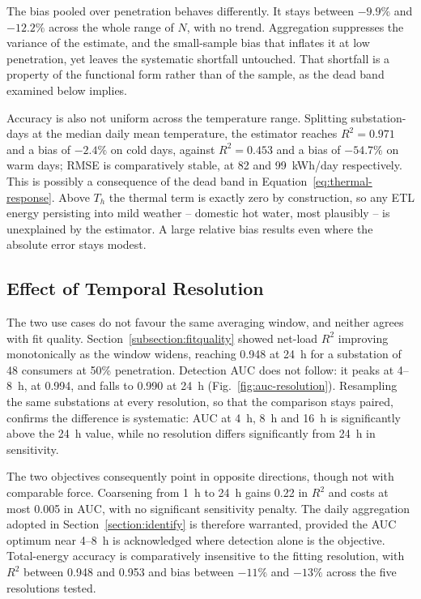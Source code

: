 \documentclass[9pt,journal,a4]{IEEEtran}
\begin{document}
The bias pooled over penetration behaves differently. It stays between $-9.9\%$ and $-12.2\%$ across the whole range of $N$, with no trend. Aggregation suppresses the variance of the estimate, and the small-sample bias that inflates it at low penetration, yet leaves the systematic shortfall untouched. That shortfall is a property of the functional form rather than of the sample, as the dead band examined below implies.

Accuracy is also not uniform across the temperature range. Splitting substation-days at the median daily mean temperature, the estimator reaches $R^2 = 0.971$ and a bias of $-2.4\%$ on cold days, against $R^2 = 0.453$ and a bias of $-54.7\%$ on warm days; RMSE is comparatively stable, at 82 and 99~kWh/day respectively. This is possibly a consequence of the dead band in Equation~\eqref{eq:thermal-response}. Above $T_h$ the thermal term is exactly zero by construction, so any ETL energy persisting into mild weather -- domestic hot water, most plausibly -- is unexplained by the estimator. A large relative bias results even where the absolute error stays modest.


\subsection{Effect of Temporal Resolution}
\label{subsection:resolution}

The two use cases do not favour the same averaging window, and neither agrees with fit quality. Section~\ref{subsection:fitquality} showed net-load $R^2$ improving monotonically as the window widens, reaching 0.948 at 24~h for a substation of 48 consumers at 50\% penetration. Detection AUC does not follow: it peaks at 4--8~h, at 0.994, and falls to 0.990 at 24~h (Fig.~\ref{fig:auc-resolution}). Resampling the same substations at every resolution, so that the comparison stays paired, confirms the difference is systematic: AUC at 4~h, 8~h and 16~h is significantly above the 24~h value, while no resolution differs significantly from 24~h in sensitivity.

The two objectives consequently point in opposite directions, though not with comparable force. Coarsening from 1~h to 24~h gains 0.22 in $R^2$ and costs at most 0.005 in AUC, with no significant sensitivity penalty. The daily aggregation adopted in Section~\ref{section:identify} is therefore warranted, provided the AUC optimum near 4--8~h is acknowledged where detection alone is the objective. Total-energy accuracy is comparatively insensitive to the fitting resolution, with $R^2$ between 0.948 and 0.953 and bias between $-11\%$ and $-13\%$ across the five resolutions tested.
\end{document}
